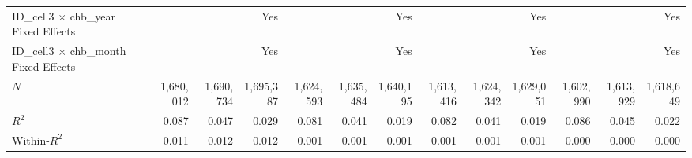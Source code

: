 \begin{tabular}{lrrrrrrrrrrrr}
ID\_cell3 $\times$ chb\_year Fixed Effects  &              &              &          Yes &              &              &          Yes &              &              &          Yes &              &              &          Yes \\ 
ID\_cell3 $\times$ chb\_month Fixed Effects &              &              &          Yes &              &              &          Yes &              &              &          Yes &              &              &          Yes \\ 
\midrule
$N$                                         &    1,680,012 &    1,690,734 &    1,695,387 &    1,624,593 &    1,635,484 &    1,640,195 &    1,613,416 &    1,624,342 &    1,629,051 &    1,602,990 &    1,613,929 &    1,618,649 \\ 
$R^2$                                       &        0.087 &        0.047 &        0.029 &        0.081 &        0.041 &        0.019 &        0.082 &        0.041 &        0.019 &        0.086 &        0.045 &        0.022 \\ 
Within-$R^2$                                &        0.011 &        0.012 &        0.012 &        0.001 &        0.001 &        0.001 &        0.001 &        0.001 &        0.001 &        0.000 &        0.000 &        0.000 \\ 
\bottomrule
\end{tabular}
